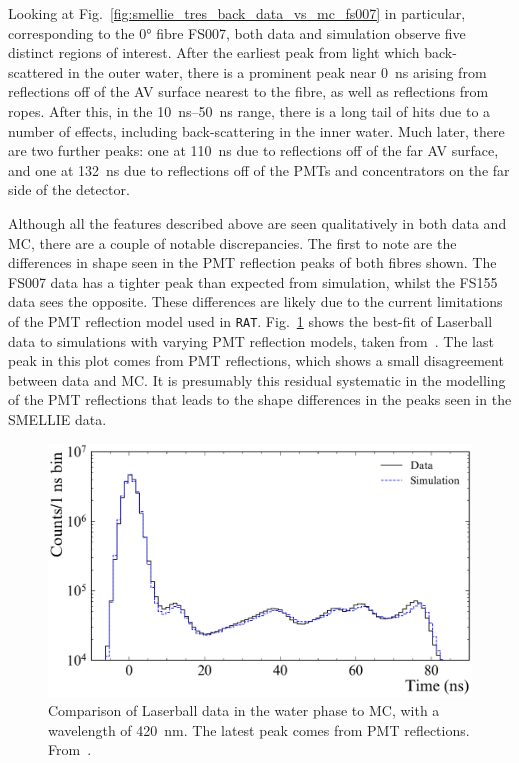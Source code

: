 Looking at Fig.~\ref{fig:smellie_tres_back_data_vs_mc_fs007} in particular, corresponding to the \ang{0} fibre FS007, both data and simulation observe five distinct regions of interest. After the earliest peak from light which back-scattered in the outer water, there is a prominent peak near \SI{0}{\ns} arising from reflections off of the AV surface nearest to the fibre, as well as reflections from ropes. After this, in the \SIrange{10}{50}{\ns} range, there is a long tail of hits due to a number of effects, including back-scattering in the inner water. Much later, there are two further peaks: one at \SI{110}{\ns} due to reflections off of the far AV surface, and one at \SI{132}{\ns} due to reflections off of the PMTs and concentrators on the far side of the detector.

Although all the features described above are seen qualitatively in both data and MC, there are a couple of notable discrepancies. The first to note are the differences in shape seen in the PMT reflection peaks of both fibres shown. The FS007 data has a tighter peak than expected from simulation, whilst the FS155 data sees the opposite. These differences are likely due to the current limitations of the PMT reflection model used in \texttt{RAT}. Fig.~\ref{fig:smellie_laserball_late_light_data_vs_mc} shows the best-fit of Laserball data to simulations with varying PMT reflection models, taken from~\cite{andersonOpticalCalibrationSNO2021}. The last peak in this plot comes from PMT reflections, which shows a small disagreement between data and MC. It is presumably this residual systematic in the modelling of the PMT reflections that leads to the shape differences in the peaks seen in the SMELLIE data.

\begin{figure}
    \centering
    \includegraphics[width=\textwidth]{4_SMELLIESimulation/images/latelight.pdf}
    \caption[Comparison of Laserball data in the water phase to MC]
    {Comparison of Laserball data in the water phase to MC, with a wavelength of \SI{420}{\nm}. The latest peak comes from PMT reflections. From~\cite{andersonOpticalCalibrationSNO2021}.}
    \label{fig:smellie_laserball_late_light_data_vs_mc}
\end{figure}


